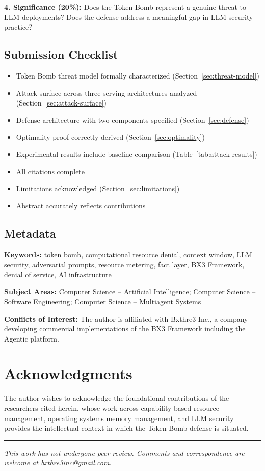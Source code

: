 \documentclass[12pt]{article}
\begin{document}
\textbf{4. Significance (20\%):} Does the Token Bomb represent a genuine threat to LLM deployments? Does the defense address a meaningful gap in LLM security practice?

\subsection*{Submission Checklist}

\begin{itemize}
    \item[ ] Token Bomb threat model formally characterized (Section~\ref{sec:threat-model})
    \item[ ] Attack surface across three serving architectures analyzed (Section~\ref{sec:attack-surface})
    \item[ ] Defense architecture with two components specified (Section~\ref{sec:defense})
    \item[ ] Optimality proof correctly derived (Section~\ref{sec:optimality})
    \item[ ] Experimental results include baseline comparison (Table~\ref{tab:attack-results})
    \item[ ] All citations complete
    \item[ ] Limitations acknowledged (Section~\ref{sec:limitations})
    \item[ ] Abstract accurately reflects contributions
\end{itemize}

\subsection*{Metadata}

\textbf{Keywords:} token bomb, computational resource denial, context window, LLM security, adversarial prompts, resource metering, fact layer, BX3 Framework, denial of service, AI infrastructure

\textbf{Subject Areas:} Computer Science -- Artificial Intelligence; Computer Science -- Software Engineering; Computer Science -- Multiagent Systems

\textbf{Conflicts of Interest:} The author is affiliated with Bxthre3 Inc., a company developing commercial implementations of the BX3 Framework including the Agentic platform.

\section*{Acknowledgments}

The author wishes to acknowledge the foundational contributions of the researchers cited herein, whose work across capability-based resource management, operating systems memory management, and LLM security provides the intellectual context in which the Token Bomb defense is situated.




\vspace{2em}
\hrule
\vspace{0.5em}
\noindent\small\textit{This work has not undergone peer review. Comments and correspondence are welcome at bxthre3inc@gmail.com.}
\end{document}
